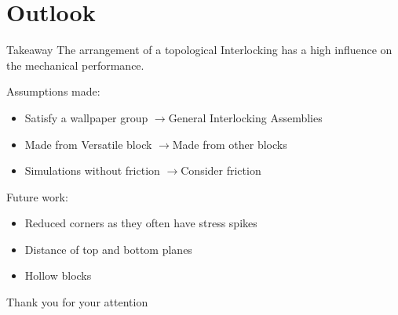 \documentclass{beamer}
\numberwithin{equation}{aufgabe}
\begin{document}
\section{Outlook}
\begin{frame}
    \begin{exampleblock}{Takeaway}
        The arrangement of a topological Interlocking has a high influence on the mechanical performance.
    \end{exampleblock}
    \pause
    Assumptions made:
    \begin{itemize}
        \item Satisfy a wallpaper group \pause$\xrightarrow{}$General Interlocking Assemblies
        \pause
        \item Made from Versatile block \pause $\xrightarrow{}$Made from other blocks
        \pause
        \item Simulations  without friction \pause $\xrightarrow{}$Consider friction
    \end{itemize}
    \pause
    Future work:
    \begin{itemize}
        \item Reduced corners as they often have stress spikes
        \pause
        \item Distance of top and bottom planes
        \pause
        \item Hollow blocks
    \end{itemize}
\end{frame}

\appendix
\begin{frame}    
    Thank you for your attention \bigskip
    \printbibliography 
\end{frame}
\end{document}

